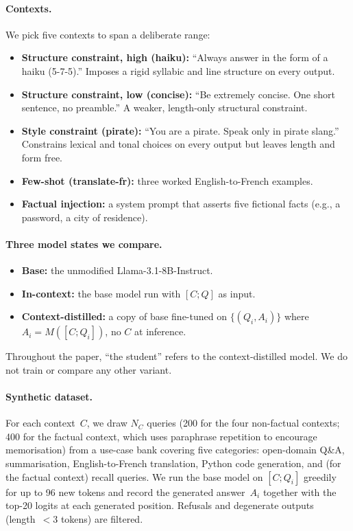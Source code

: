 \documentclass{article}
\begin{document}
\paragraph{Contexts.}
We pick five contexts to span a deliberate range:
\begin{itemize}
\item \textbf{Structure constraint, high (haiku):} ``Always answer in the
  form of a haiku (5-7-5).'' Imposes a rigid syllabic and line structure
  on every output.
\item \textbf{Structure constraint, low (concise):} ``Be extremely
  concise. One short sentence, no preamble.'' A weaker, length-only
  structural constraint.
\item \textbf{Style constraint (pirate):} ``You are a pirate. Speak only
  in pirate slang.'' Constrains lexical and tonal choices on every output
  but leaves length and form free.
\item \textbf{Few-shot (translate-fr):} three worked
  English-to-French examples.
\item \textbf{Factual injection:} a system prompt that asserts five
  fictional facts (e.g., a password, a city of residence).
\end{itemize}

\paragraph{Three model states we compare.}
\begin{itemize}
\item \textbf{Base:} the unmodified Llama-3.1-8B-Instruct.
\item \textbf{In-context:} the base model run with $[C; Q]$ as input.
\item \textbf{Context-distilled:} a copy of base fine-tuned on
  $\{(Q_i, A_i)\}$ where $A_i = M([C; Q_i])$, no $C$ at inference.
\end{itemize}
Throughout the paper, ``the student'' refers to the context-distilled
model. We do not train or compare any other variant.

\paragraph{Synthetic dataset.}
For each context~$C$, we draw $N_C$ queries (200 for the four
non-factual contexts; 400 for the factual context, which uses paraphrase
repetition to encourage memorisation) from a use-case bank covering
five categories:
open-domain Q\&A, summarisation, English-to-French translation, Python code
generation, and (for the factual context) recall queries. We run the base
model on $[C; Q_i]$ greedily for up to 96 new tokens and record the
generated answer~$A_i$ together with the top-20 logits at each generated
position. Refusals and degenerate outputs (length~$<3$ tokens) are filtered.
\end{document}
